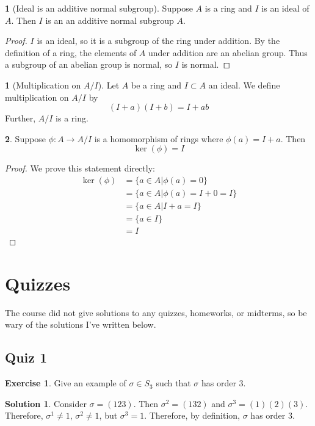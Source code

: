 \documentclass[12pt]{article}
\theoremstyle{definition}
\newtheorem{definition}{\color{NavyBlue}{\textbf{Definition}}}
\newtheorem{theorem}{\color{ForestGreen}{\textbf{Theorem}}}
\newtheorem{exercise}{\color{YellowOrange}Exercise}
\theoremstyle{definition}
\newtheorem{solution}{\color{Goldenrod}Solution}
\begin{document}
\begin{theorem}[Ideal is an additive normal subgroup]
	Suppose $A$ is a ring and $I$ is an ideal of $A$. Then $I$ is an an additive normal subgroup $A$.
\end{theorem}
\begin{proof}
	$I$ is an ideal, so it is a subgroup of the ring under addition. By the definition of a ring, the elements of $A$ under addition are an abelian group. Thus a subgroup of an abelian group is normal, so $I$ is normal. 
\end{proof}

\begin{definition}[Multiplication on $A/I$]
	Let $A$ be a ring and $I \subset A$ an ideal. We define multiplication on $A/I$ by 
	\begin{equation}
		(I+a)(I+b) = I + ab
	\end{equation}
	Further, $A/I$ is a ring.
\end{definition}

\begin{theorem}
	Suppose $\phi : A \to A/I$ is a homomorphism of rings where $\phi(a) = I + a$. Then 
	\begin{equation}
		\ker(\phi) = I
	\end{equation}
\end{theorem}
\begin{proof}
	We prove this statement directly:
	\begin{align*}
		\ker(\phi) &= \{ a \in A | \phi(a) = 0\} \\ 
		&= \{ a \in A | \phi(a) = I + 0 = I\} \tag{$I$ is the trivial element of the quotient}\\
		&= \{ a \in A | I + a = I \} \\
		&= \{ a \in I \} \\
		&= I
	\end{align*}
\end{proof}

\section{Quizzes}
The course did not give solutions to any quizzes, homeworks, or midterms, so be wary of the solutions I've written below. 

\subsection{Quiz 1}

\begin{exercise}
Give an example of $\sigma \in S_3$ such that $\sigma$ has order 3. 
\end{exercise}
\begin{solution}
Consider $\sigma = (1 2 3)$. Then $\sigma^2 = (1 3 2)$ and $\sigma^3 = (1)(2)(3)$. Therefore, $\sigma^1 \neq 1$, $\sigma^2 \neq 1$, but $\sigma^3 = 1$. Therefore, by definition, $\sigma$ has order $3$.
\end{solution}
\end{document}
